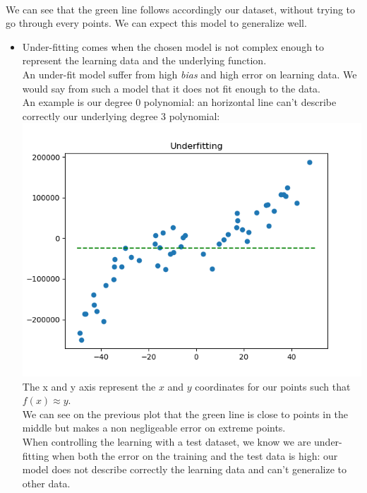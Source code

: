 \documentclass[a4paper, 10pt]{article}
\begin{document}
\\
We can see that the green line follows accordingly our dataset, without trying to go through
every points. We can expect this model to generalize well.
\begin{itemize}[label=$\square$]
    \item Under-fitting comes when the chosen model is not complex enough
    to represent the learning data and the underlying function. 
    \\
    An under-fit model suffer from high \emph{bias} and high error on learning data.    
    We would say from such a model that it does not fit enough to the data.
    \\
    An example is our degree 0 polynomial: an horizontal line can't describe 
    correctly our underlying degree 3 polynomial:
    \\
    \includegraphics{ex1a_under}
    \\
    The x and y axis represent the $x$ and $y$ coordinates for our points such that
    $f(x) \approx y$.
    \\
    We can see on the previous plot that the green line is close to points in the 
    middle but makes a non negligeable error on extreme points.
    \\
    When controlling the learning with a test dataset, we know we are under-fitting when
    both the error on the training and the test data is high: our model does not describe 
    correctly the learning data and can't generalize to other data.
    

\end{itemize}
\end{document}
